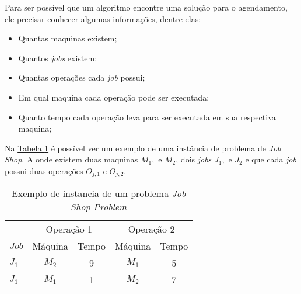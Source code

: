            \noindent Para ser possível que um algoritmo encontre uma solução para o agendamento, ele precisar conhecer algumas informações, dentre elas: 
            \begin{itemize}
                \item Quantas maquinas existem;
                \item Quantos \textit{jobs} existem;
                \item Quantas operações cada \textit{job} possui;
                \item Em qual maquina cada operação pode ser executada;
                \item Quanto tempo cada operação leva para ser executada em sua respectiva maquina;
            \end{itemize}


            Na 
            \hyperref[fig:ex-instancia-problema-JSP]{Tabela \ref{fig:ex-instancia-problema-JSP}}
            é possível ver um exemplo de uma instância de problema de \textit{Job Shop}. 
            A onde existem duas maquinas $M_1, $ e $M_2$, 
            dois \textit{jobs} $J_1, $ e $J_2$ 
            e que cada \textit{job} possui 
            duas operações $O_{j,1} $ e $O_{j,2}$.
            
\begin{table}[htb]
    \centering
    \caption{Exemplo de instancia de um problema \textit{Job Shop Problem}}
    \label{fig:ex-instancia-problema-JSP}
    \begin{tabular}[t]{lcccc}
        \hline
        &\multicolumn{2}{c}{Operação 1}&\multicolumn{2}{c}{Operação 2}\\
        $Job$&Máquina&Tempo&Máquina&Tempo\\
        \hline
        $J_1$&$M_2$&9&$M_1$&5\\
        $J_1$&$M_1$&1&$M_2$&7\\
        \hline
    \end{tabular}
\end{table}

